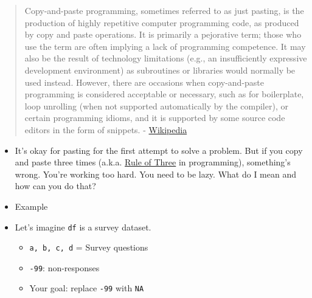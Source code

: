 \documentclass[
]{book}
\begin{document}
\begin{quote}
Copy-and-paste programming, sometimes referred to as just pasting, is the production of highly repetitive computer programming code, as produced by copy and paste operations. It is primarily a pejorative term; those who use the term are often implying a lack of programming competence. It may also be the result of technology limitations (e.g., an insufficiently expressive development environment) as subroutines or libraries would normally be used instead. However, there are occasions when copy-and-paste programming is considered acceptable or necessary, such as for boilerplate, loop unrolling (when not supported automatically by the compiler), or certain programming idioms, and it is supported by some source code editors in the form of snippets. - \href{https://en.wikipedia.org/wiki/Copy-and-paste_programming}{Wikipedia}
\end{quote}

\begin{itemize}
\item
  It's okay for pasting for the first attempt to solve a problem. But if you copy and paste three times (a.k.a. \href{https://en.wikipedia.org/wiki/Rule_of_three_(computer_programming)}{Rule of Three} in programming), something's wrong. You're working too hard. You need to be lazy. What do I mean and how can you do that?
\item
  Example
\item
  Let's imagine \texttt{df} is a survey dataset.

  \begin{itemize}
  \item
    \texttt{a,\ b,\ c,\ d} = Survey questions
  \item
    \texttt{-99}: non-responses
  \item
    Your goal: replace \texttt{-99} with \texttt{NA}
  \end{itemize}
\end{itemize}
\end{document}
